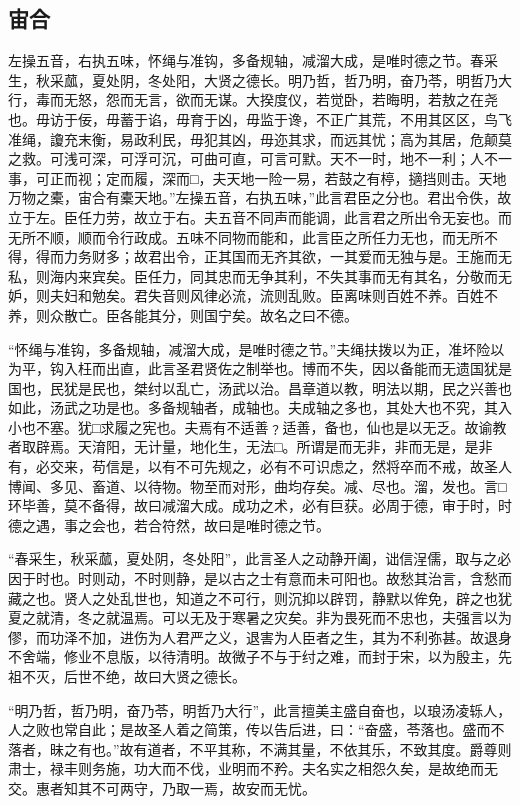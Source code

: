 \documentclass[]{article}
\begin{document}
\hypertarget{header-n204}{%
\subsection{宙合}\label{header-n204}}

左操五音，右执五味，怀绳与准钩，多备规轴，减溜大成，是唯时德之节。春采生，秋采蓏，夏处阴，冬处阳，大贤之德长。明乃哲，哲乃明，奋乃苓，明哲乃大行，毒而无怒，怨而无言，欲而无谋。大揆度仪，若觉卧，若晦明，若敖之在尧也。毋访于佞，毋蓄于谄，毋育于凶，毋监于谗，不正广其荒，不用其区区，鸟飞准绳，讂充末衡，易政利民，毋犯其凶，毋迩其求，而远其忧；高为其居，危颠莫之救。可浅可深，可浮可沉，可曲可直，可言可默。天不一时，地不一利；人不一事，可正而视；定而履，深而□，夫天地一险一易，若鼓之有楟，擿挡则击。天地万物之橐，宙合有橐天地。''左操五音，右执五味，''此言君臣之分也。君出令佚，故立于左。臣任力劳，故立于右。夫五音不同声而能调，此言君之所出令无妄也。而无所不顺，顺而令行政成。五味不同物而能和，此言臣之所任力无也，而无所不得，得而力务财多；故君出令，正其国而无齐其欲，一其爱而无独与是。王施而无私，则海内来宾矣。臣任力，同其忠而无争其利，不失其事而无有其名，分敬而无妒，则夫妇和勉矣。君失音则风律必流，流则乱败。臣离味则百姓不养。百姓不养，则众散亡。臣各能其分，则国宁矣。故名之曰不德。

``怀绳与准钩，多备规轴，减溜大成，是唯时德之节。''夫绳扶拨以为正，准坏险以为平，钩入枉而出直，此言圣君贤佐之制举也。博而不失，因以备能而无遗国犹是国也，民犹是民也，桀纣以乱亡，汤武以治。昌章道以教，明法以期，民之兴善也如此，汤武之功是也。多备规轴者，成轴也。夫成轴之多也，其处大也不究，其入小也不塞。犹□求履之宪也。夫焉有不适善﹖适善，备也，仙也是以无乏。故谕教者取辟焉。天淯阳，无计量，地化生，无法□。所谓是而无非，非而无是，是非有，必交来，苟信是，以有不可先规之，必有不可识虑之，然将卒而不戒，故圣人博闻、多见、畜道、以待物。物至而对形，曲均存矣。减、尽也。溜，发也。言□环毕善，莫不备得，故曰减溜大成。成功之术，必有巨获。必周于德，审于时，时德之遇，事之会也，若合符然，故曰是唯时德之节。

``春采生，秋采蓏，夏处阴，冬处阳''，此言圣人之动静开阖，诎信浧儒，取与之必因于时也。时则动，不时则静，是以古之士有意而未可阳也。故愁其治言，含愁而藏之也。贤人之处乱世也，知道之不可行，则沉抑以辟罚，静默以侔免，辟之也犹夏之就清，冬之就温焉。可以无及于寒暑之灾矣。非为畏死而不忠也，夫强言以为僇，而功泽不加，进伤为人君严之义，退害为人臣者之生，其为不利弥甚。故退身不舍端，修业不息版，以待清明。故微子不与于纣之难，而封于宋，以为殷主，先祖不灭，后世不绝，故曰大贤之德长。

``明乃哲，哲乃明，奋乃苓，明哲乃大行''，此言擅美主盛自奋也，以琅汤凌轹人，人之败也常自此；是故圣人着之简策，传以告后进，曰：``奋盛，苓落也。盛而不落者，昧之有也。''故有道者，不平其称，不满其量，不依其乐，不致其度。爵尊则肃士，禄丰则务施，功大而不伐，业明而不矜。夫名实之相怨久矣，是故绝而无交。惠者知其不可两守，乃取一焉，故安而无忧。
\end{document}
